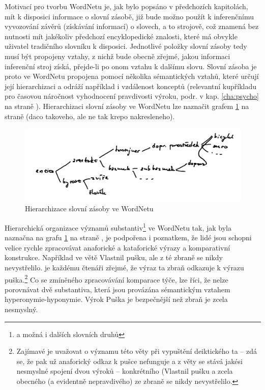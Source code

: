 \documentclass[a4paper, 11pt, oneside]{book}
\newcommand\ex{\textsf}
\begin{document}
			Motivací pro tvorbu WordNetu je, jak bylo popsáno v předchozích kapitolách, mít k disposici informace o slovní zásobě, již bude možno použít k inferenčnímu vyvozování závěrů (získávání informací) o slovech, a to strojově, což znamená bez nutnosti mít jakékoliv předchozí encyklopedické znalosti, které má obvykle uživatel tradičního slovníku k disposici. Jednotlivé položky slovní zásoby tedy musí být propojeny vztahy, z nichž bude obecně zřejmé, jakou informaci inferenční stroj získá, přejde-li po onom vztahu k dalšímu slovu. Slovní zásoba je proto ve WordNetu propojena pomocí několika sémantických vztahů, které určují její hierarchizaci a odráží například i vzdálenost konceptů (relevantní kupříkladu pro časovou náročnost vyhodnocení pravdivosti výroku, podr. v kap. \ref{cha:psycho} na straně \pageref{cha:psycho}). Hierarchizaci slovní zásoby ve WordNetu lze naznačit grafem \ref{fig:hierchWN} na straně \pageref{fig:hierchWN} (daco takoveho, ale ne tak krepo nakresleneho). 

			\begin{figure}[h]
				\centering
				\includegraphics[width=1.0\textwidth]{screenshot_2017-03-31_14-14-36.png}
				\caption{Hierarchizace slovní zásoby ve WordNetu}
				\label{fig:hierchWN}
			\end{figure}

			Hierarchická organizace významů substantiv\footnote{a možná i dalších slovních druhů} ve WordNetu tak, jak byla naznačna na grafu \ref{fig:hierchWN} na straně \pageref{fig:hierchWN}, je podpořena i poznatkem, že lidé jsou schopni velice rychle zpracovávat anaforické a kataforické výrazy a komparativní konstrukce. Například ve větě \ex{Vlastnil pušku, ale z té zbraně se nikdy nevystřelilo.} je každému čtenáři zřejmé, že výraz \ex{ta zbraň} odkazuje k výrazu \ex{puška}.\footnote{Zajímavé je uvažovat o významu této věty při vypuštění deiktického \ex{ta} -- zdá se, že pak už anaforický odkaz k \ex{pušce} nefunguje a z věty se stává jakési nesmyslné spojení dvou výroků -- konkrétního (\ex{Vlastnil pušku} a zcela obecného (a evidentně nepravdivého) \ex{ze zbraně se nikdy nevystřelilo}.} Co se zmíněného zpracovávání komparace týče, lze říci, že nelze porovnávat dvě substantiva, která jsou provázána sémantickým vztahem hyperonymie-hyponymie. Výrok \ex{Puška je bezpečnější než zbraň} je zcela nesmyslný. \parencite{pala2013vceska} %
		
\end{document}
